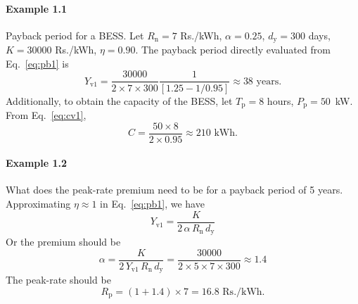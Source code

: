 \paragraph{Example 1.1} Payback period for a BESS.
Let $R_{\text{n}} = 7$ Rs./kWh, $\alpha = 0.25$,
$d_\text{y} = 300$ days, $K = 30000$ Rs./kWh, $\eta = 0.90$.
The payback period directly evaluated from Eq.~\eqref{eq:pb1} is
\begin{equation}
    Y_\text{v1} = \frac{30000}{2 \times 7 \times 300} 
    \frac{1}{ [1.25 - 1/0.95]} \approx 38 \text{ years}.
\end{equation}
Additionally, to obtain the capacity of the BESS, let
$T_{\text{p}} = 8$ hours, $P_{\text{p}} = 50$~kW. From Eq.~\eqref{eq:cv1},
\begin{equation}
    C = \frac{50 \times 8}{2 \times 0.95} \approx 210 \text{ kWh}.
\end{equation}

\paragraph{Example 1.2} What does the peak-rate premium need to be for a payback period of 5 years. 
Approximating $\eta \approx 1$ in Eq.~\eqref{eq:pb1}, we have
\begin{equation}
    Y_\text{v1} = \frac{K}{  2 \, \alpha \, R_\text{n} \, d_\text{y}} 
\end{equation}
Or the premium should be
\begin{equation}
    \alpha = 
        \frac{K}{ 2\, Y_\text{v1} \, R_\text{n} \, d_\text{y}}
        = 
        \frac{30000}{2 \times 5 \times 7 \times 300} \approx 1.4
\end{equation}
The peak-rate should be 
\begin{equation}
    R_{\text{p}} = (1+1.4) \times 7 = 16.8 \text{ Rs./kWh}.
\end{equation}








